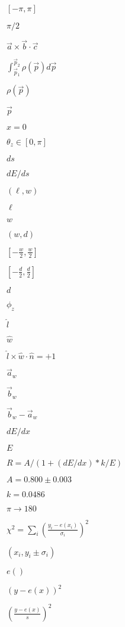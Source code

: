 \documentclass{article}
\begin{document}
$ \left[ -\pi, \pi \right] $
\pagebreak

$ \pi/2 $
\pagebreak

$ \vec{a} \times \vec{b} \cdot \vec{c} $
\pagebreak

$ \int_{\vec{p}_{1}}^{\vec{p}_{2}} \rho(\vec{p}) d\vec{p} $
\pagebreak

$ \rho(\vec{p}) $
\pagebreak

$ \vec{p} $
\pagebreak

$ x = 0 $
\pagebreak

$ \theta_{z} \in [ 0, \pi ]$
\pagebreak

$ ds $
\pagebreak

$ dE/ds $
\pagebreak

$ ( \ell, w ) $
\pagebreak

$ \ell $
\pagebreak

$ w $
\pagebreak

$ ( w, d ) $
\pagebreak

$ \left[ -\frac{w}{2}, \frac{w}{2} \right] $
\pagebreak

$ \left[ -\frac{d}{2}, \frac{d}{2} \right] $
\pagebreak

$ d $
\pagebreak

$ \phi_{z} $
\pagebreak

$ \hat{l} $
\pagebreak

$ \hat{w} $
\pagebreak

$ \hat{l} \times \hat{w} \cdot \hat{n} = +1 $
\pagebreak

$ \vec{a}_{w} $
\pagebreak

$ \vec{b}_{w} $
\pagebreak

$ \vec{b}_{w} - \vec{a}_{w} $
\pagebreak

$ dE/dx $
\pagebreak

$ E $
\pagebreak

$ R = A/(1 + (dE/dx)*k/E) $
\pagebreak

$ A = 0.800 \pm 0.003 $
\pagebreak

$ k = 0.0486 $
\pagebreak

$ \pi \rightarrow 180 $
\pagebreak

$ \chi^{2} = \sum_{i} \left(\frac{y_{i} - e(x_{i})}{\sigma_{i}}\right)^{2} $
\pagebreak

$ ( x_{i}, y_{i} \pm \sigma_{i} ) $
\pagebreak

$ e() $
\pagebreak

$ \left(y - e(x)\right)^{2} $
\pagebreak

$ \left(\frac{y - e(x)}{s}\right)^{2} $
\pagebreak
\end{document}
